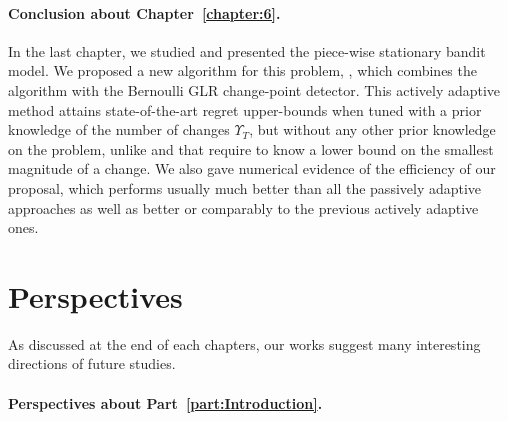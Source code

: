 \paragraph{Conclusion about \textbf{Chapter~\ref{chapter:6}}.}

In the last chapter, we studied and presented the piece-wise stationary bandit model.
%
We proposed a new algorithm for this problem, \GLRklUCB, which combines the \klUCB{} algorithm with the Bernoulli GLR change-point detector.
This actively adaptive method attains state-of-the-art regret upper-bounds when tuned with a prior knowledge of the number of changes $\Upsilon_T$, but without any other prior knowledge on the problem, unlike \CUSUMUCB{} and \MUCB{} that require to know a lower bound on the smallest magnitude of a change.
We also gave numerical evidence of the efficiency of our proposal, which performs usually much better than all the passively adaptive approaches as well as better or comparably to the previous actively adaptive ones.



\section{Perspectives}

As discussed at the end of each chapters, our works suggest many interesting directions of future studies.





\paragraph{Perspectives about \textbf{Part~\ref{part:Introduction}}.}



